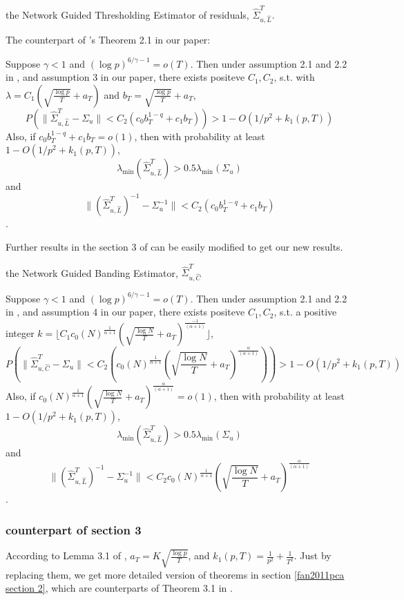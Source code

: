 the Network Guided Thresholding Estimator of residuals, $\hat \Sigma_{u,\hat L}^T$.

\begin{thm}
    The counterpart of \cite{fanHighDimensionalCovarianceMatrix2011}'s Theorem 2.1 in our paper:

Suppose $\gamma < 1$ and $(\log p)^{6/\gamma - 1} = o(T)$. Then under assumption 2.1 and 2.2 in \cite{fanHighDimensionalCovarianceMatrix2011}, and assumption 3 in our paper, there exists positeve $C_1, C_2$, s.t. with $\lambda = C_1 (\sqrt{\frac{\log p}{T}} + a_T)$ and $b_T = \sqrt{\frac{\log p}{T}} + a_T$, 
$$ P( \| \hat \Sigma_{u,\hat L}^T - \Sigma_u \| < C_2( c_0 b_T^{1-q} + c_1 b_T ) ) > 1 - O(1/p^2 + k_1 (p,T)) $$
Also, if $c_0 b_T^{1-q} + c_1 b_T = o(1)$, then with probability at least $1 - O(1/p^2 + k_1 (p,T))$, $$\lambda_{\min} (\hat \Sigma_{u,\hat L}^T) > 0.5 \lambda_{\min} (\Sigma_u)$$ and $$\| (\hat \Sigma_{u,\hat L}^T)^{-1} - \Sigma_u^{-1} \| < C_2 (c_0 b_T^{1-q} + c_1 b_T) $$.
\end{thm}

 Further results in the section 3 of \cite{fanHighDimensionalCovarianceMatrix2011} can be easily modified to get our new results.

the Network Guided Banding Estimator, $\hat \Sigma_{u,\hat C}^T$
\begin{thm}
    Suppose $\gamma < 1$ and $(\log p)^{6/\gamma - 1} = o(T)$. Then under assumption 2.1 and 2.2 in \cite{fanHighDimensionalCovarianceMatrix2011}, and assumption 4 in our paper, there exists positeve $C_1, C_2$, s.t. a positive integer $k = \lfloor C_1 c_0(N)^\frac{1}{\alpha+1}  ( \sqrt{\frac{\log N}{T}} + a_T )^\frac{-1}{(\alpha+1)} \rfloor$, 
$$ P( \| \hat \Sigma_{u,\hat C}^T - \Sigma_u \| < C_2( c_0(N)^\frac{1}{\alpha+1}  ( \sqrt{\frac{\log N}{T}} + a_T )^\frac{\alpha}{(\alpha+1)} ) ) > 1 - O(1/p^2 + k_1 (p,T)) $$
Also, if $c_0(N)^\frac{1}{\alpha+1}  ( \sqrt{\frac{\log N}{T}} + a_T )^\frac{\alpha}{(\alpha+1)} = o(1)$, then with probability at least $1 - O(1/p^2 + k_1 (p,T))$, $$\lambda_{\min} (\hat \Sigma_{u,\hat L}^T) > 0.5 \lambda_{\min} (\Sigma_u)$$ and $$\| (\hat \Sigma_{u,\hat L}^T)^{-1} - \Sigma_u^{-1} \| < C_2 c_0(N)^\frac{1}{\alpha+1}  ( \sqrt{\frac{\log N}{T}} + a_T )^\frac{\alpha}{(\alpha+1)} $$.
\end{thm}


\subsubsection{counterpart of section 3}
According to Lemma 3.1 of \cite{fanHighDimensionalCovarianceMatrix2011}, $a_T = K\sqrt{\frac{\log p}{T}}$, and $k_1(p,T)=\frac{1}{p^2} + \frac{1}{T^2}$. Just by replacing them, we get more detailed version of theorems in section \ref{fan2011pca section 2}, which are counterparts of Theorem 3.1 in \cite{fanHighDimensionalCovarianceMatrix2011}. 

